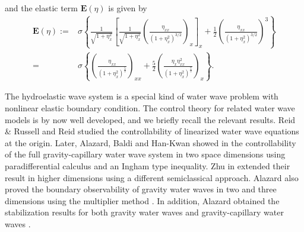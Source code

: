 \documentclass[12pt]{amsart}
\theoremstyle{remark}
\theoremstyle{definition}
\numberwithin{equation}{section}
\newcommand{\f}{\frac}
\begin{document}
and the elastic term $\mathbf{E}(\eta)$ is given by
\begin{equation} \label{Elastic}
\begin{aligned}
    \mathbf{E}(\eta) :=&\sigma\left\{\frac{1}{\sqrt{1+\eta_x^2}} 
    \left[ \frac{1}{\sqrt{1+\eta_x^2}} 
    \left( \frac{\eta_{xx}}{(1+\eta_x^2)^{3/2}} \right)_x \right]_x
    + \frac{1}{2} \left( \frac{\eta_{xx}}{(1+\eta_x^2)^{3/2}} \right)^3\right\} \\
    =&\sigma\left\{\left(\f{\eta_{xx}}{(1+\eta^2_x)^{\f52}}\right)_{xx}+\f52\left(\f{\eta_x\eta_{xx}^2}{(1+\eta^2_x)^{\f72}}\right)_x \right\}.
\end{aligned}
\end{equation}

The hydroelastic wave system is a special kind of water wave problem with nonlinear elastic boundary condition.
The control theory for related water wave models is by now well developed, and we briefly recall the relevant results.
Reid \& Russell \cite{MR0774033} and Reid \cite{MR0846383, MR1348122} studied the controllability of linearized water wave equations at the origin.
Later, Alazard, Baldi and Han-Kwan showed in \cite{MR3776276} the controllability of the full gravity-capillary water wave system in two space dimensions using paradifferential calculus and an Ingham type inequality.
 Zhu in \cite{MR4072685} extended their result in higher dimensions using a different semiclassical approach.
Alazard  also proved the boundary observability of gravity water waves in two and three dimensions using the multiplier method \cite{MR3778651}.
In addition, Alazard obtained the stabilization results for both gravity water waves \cite{MR3801750} and gravity-capillary water waves \cite{MR3708590}.
\end{document}

